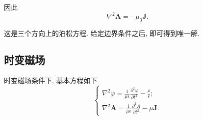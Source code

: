 因此
\begin{equation}
    \nabla^2\bm{A}=-\mu_0\bm{J}.
\end{equation}

这是三个方向上的泊松方程. 给定边界条件之后, 即可得到唯一解.

\subsection{时变磁场}
时变磁场条件下, 基本方程如下
\begin{equation}
    \begin{cases}
        \nabla^2\varphi=\frac{1}{\mu\epsilon}\frac{\partial^2\varphi}{\partial t^2}-\frac{\rho}{\epsilon}; \\
        \nabla^2\bm{A}=\frac{1}{\mu\epsilon}\frac{\partial^2 A}{\partial t^2}-\mu\bm{J}.
    \end{cases}
\end{equation}
